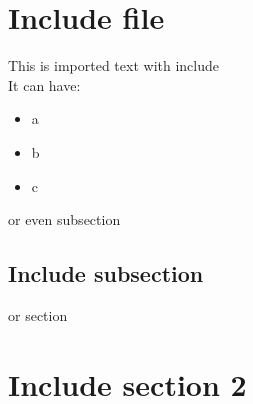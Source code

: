 \section{Include file}
This is imported text with include\\
It can have:
\begin{itemize}
    \item a
    \item b
    \item c    
\end{itemize}

or even subsection
\subsection{Include subsection}
or  section
\section{Include section 2}
